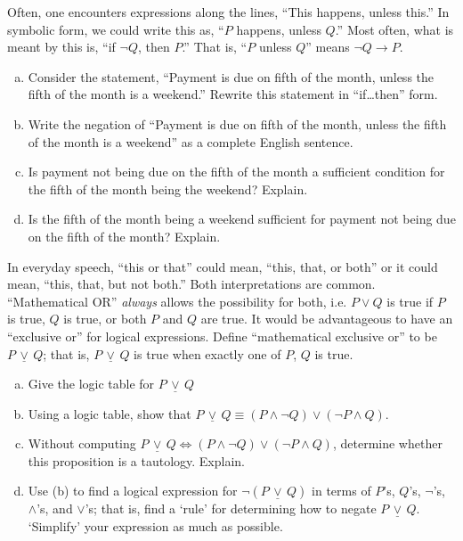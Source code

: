 \documentclass[11pt,letterpaper]{article}
\newcommand{\xor}{\,\underline{\vee}\,}
\begin{document}

 Often, one encounters expressions along the lines, ``This happens, unless this.'' In symbolic form, we could write this as, ``$P$ happens, unless $Q$.'' Most often, what is meant by this is, ``if $\neg Q$, then $P$.'' That is, ``$P$ unless $Q$'' means $\neg Q \to P$. 
	\begin{enumerate}[(a)]
	\item Consider the statement, ``Payment is due on fifth of the month, unless the fifth of the month is a weekend.'' Rewrite this statement in ``if\dots then'' form.  
	\item Write the negation of ``Payment is due on fifth of the month, unless the fifth of the month is a weekend'' as a complete English sentence. 
	\item Is payment not being due on the fifth of the month a sufficient condition for the fifth of the month being the weekend? Explain. 
	\item Is the fifth of the month being a weekend sufficient for payment not being due on the fifth of the month? Explain. 
	\end{enumerate} 



\newpage



 In everyday speech, ``this or that'' could mean, ``this, that, or both'' or it could mean, ``this, that, but not both.'' Both interpretations are common. ``Mathematical OR'' \textit{always} allows the possibility for both, i.e. $P \vee Q$ is true if $P$ is true, $Q$ is true, or both $P$ and $Q$ are true. It would be advantageous to have an ``exclusive or'' for logical expressions. Define ``mathematical exclusive or'' to be $P \xor Q$; that is, $P \xor Q$ is true when exactly one of $P$, $Q$ is true. 
	\begin{enumerate}[(a)]
	\item Give the logic table for $P \xor Q$
	\item Using a logic table, show that $P \xor Q \equiv (P \wedge \neg Q) \vee (\neg P \wedge Q)$.
	\item Without computing $P \xor Q \iff (P \wedge \neg Q) \vee (\neg P \wedge Q)$, determine whether this proposition is a tautology. Explain. 
	\item Use (b) to find a logical expression for $\neg (P \xor Q)$ in terms of $P$'s, $Q$'s, $\neg$'s, $\wedge$'s, and $\vee$'s; that is, find a `rule' for determining how to negate $P \xor Q$. `Simplify' your expression as much as possible. 	
	\end{enumerate}
\end{document}
